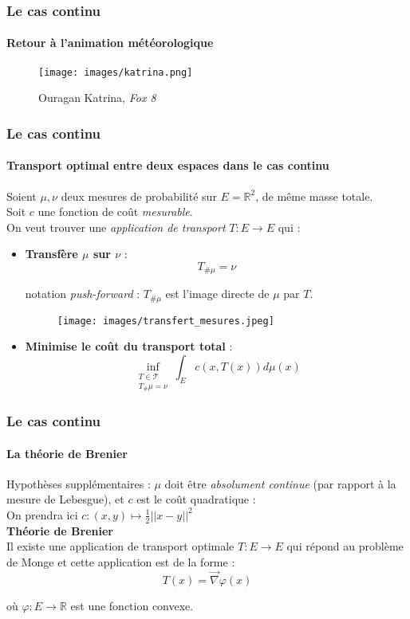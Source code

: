 \documentclass{beamer}
\begin{document}
\begin{frame}
	\frametitle{Le cas continu} 
	\framesubtitle{Retour à l'animation météorologique}
	\begin{figure}[h!]
		\centering 
		\texttt{[image: images/katrina.png]}
		\caption{Ouragan Katrina, \emph{Fox 8}}
	\end{figure}
\end{frame}
\begin{frame}
	\frametitle{Le cas continu} 
	\framesubtitle{Transport optimal entre deux espaces dans le cas continu}
	Soient $\mu, \nu$ deux mesures de probabilité sur $E= \mathbb{R}^2$, de même masse totale. \\
	Soit $c$ une fonction de coût \emph{mesurable}. \\
	On veut  trouver une \emph{application de transport} $T : E \to E$ qui : 
	\begin{itemize}
		\item \textbf{Transfère $\mu$ sur $\nu$}  : \[\boxed{T_{\# \mu} = \nu} \]
		\begin{flushright}
			\small notation \emph{push-forward} : $T_{\# \mu}$ est l'image directe de $\mu$ par $T$.
		\end{flushright}
		\begin{figure}[h!]
			\centering 
			\texttt{[image: images/transfert\_mesures.jpeg]}
		\end{figure}
	\end{itemize}
\end{frame}

\begin{frame}
	\begin{itemize}
	\item \textbf{Minimise le coût du transport total} : \[\boxed{\inf_{\substack{T \in \mathcal{T} \\ T_{\#} \mu = \nu}} \int_{E} c\left(x, T(x)\right) d\mu(x)}\]
	\end{itemize}
\end{frame}
\begin{frame}
	\frametitle{Le cas continu} 
	\framesubtitle{La théorie de Brenier}
	Hypothèses supplémentaires : $\mu$ doit être \emph{absolument continue} (par rapport à la mesure de Lebesgue), et $c$ est le coût quadratique :
	\\ On prendra ici $c : (x,y) \mapsto \frac{1}{2} || x-y ||^2$ \\
	
	\vspace*{\fill}
	\textcolor{marine_blue}{\textbf{Théorie de Brenier}}\\  Il existe une application de transport optimale $T : E \to E$ qui répond au problème de Monge et cette application est de la forme : \[T(x) = \vec{\nabla} \varphi(x)\]
	\begin{flushright}
		où $\varphi : E \to \mathbb{R}$ est une fonction convexe.
	\end{flushright}
	\vspace*{\fill}
\end{frame}
\end{document}
